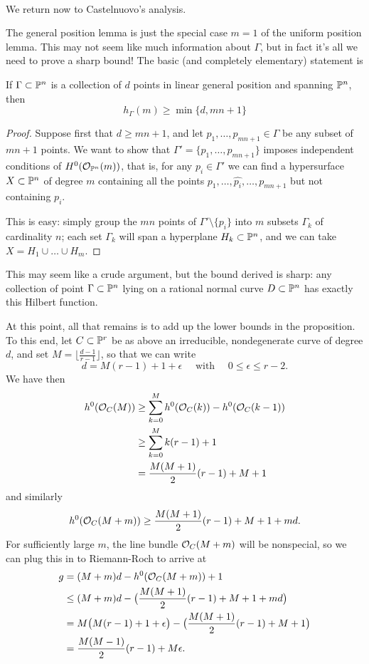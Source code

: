\

We return now to Castelnuovo's analysis.

The general position lemma is just the special case $m=1$ of the uniform position lemma. This may not seem like much information about $\Gamma$, but in fact it's all we need to prove a sharp bound! The basic (and completely elementary) statement is

\begin{proposition}
If $\Gamma \subset {\mathbb P}^n$ is a collection of $d$ points in linear general position and spanning ${\mathbb P}^n$, then 
$$
h_\Gamma(m) \geq \min\{d, mn+1\}
$$
\end{proposition}

\begin{proof}
Suppose first that $d \geq mn+1$, and let $p_1,\dots,p_{mn+1} \in \Gamma$ be any subset of $mn+1$ points. We want to show that $\Gamma' = \{p_1,\dots,p_{mn+1}\}$ imposes independent conditions of $H^0({\mathcal O}_{{\mathbb P}^n}(m))$, that is, for any $p_i \in \Gamma'$ we can find a hypersurface $X \subset {\mathbb P}^n$ of degree $m$ containing all the points $p_1,\dots, \hat{p_i},\dots,p_{mn+1}$ but not containing $p_i$.

This is easy: simply group the $mn$ points of $\Gamma' \setminus \{p_i\}$ into $m$ subsets $\Gamma_k$ of cardinality $n$; each set $\Gamma_k$ will span a hyperplane $H_k \subset {\mathbb P}^n$, and we can take $X = H_1 \cup \dots \cup H_m$. 
\end{proof}

This may seem like a crude argument, but the bound derived is sharp: any collection of point $\Gamma \subset {\mathbb P}^n$ lying on a rational normal curve $D \subset {\mathbb P}^n$ has exactly this Hilbert function.

At this point, all that remains is to add up the lower bounds in the proposition. To this end, let $C \subset {\mathbb P}^r$ be as above an irreducible, nondegenerate curve of degree $d$, and set $M = \lfloor{\frac{d-1}{r-1}}\rfloor$, so that we can write
$$
d = M(r-1) + 1 + \epsilon \quad \text{ with } \quad 0 \leq \epsilon \leq r-2.
$$
We have then
\begin{align*}
h^0({\mathcal O}_C(M)) &\geq \sum_{k=0}^M h^0({\mathcal O}_C(k)) - h^0({\mathcal O}_C(k-1)) \\
&\geq  \sum_{k=0}^M k(r-1)+1 \\
&= \frac{M(M+1)}{2}(r-1) + M + 1
\end{align*}
and similarly
$$
h^0({\mathcal O}_C(M+m)) \geq \frac{M(M+1)}{2}(r-1) + M + 1 + md.
$$
For sufficiently large $m$, the line bundle ${\mathcal O}_C(M+m)$ will be nonspecial, so we can plug this in to Riemann-Roch to arrive at
\begin{align*}
g &= (M+m)d - h^0({\mathcal O}_C(M+m)) + 1 \\
&\leq (M+m)d - \bigl(  \frac{M(M+1)}{2}(r-1) + M + 1 + md \bigr) \\
& = M\bigl( M(r-1) + 1 + \epsilon \bigr) - \bigl(  \frac{M(M+1)}{2}(r-1) + M + 1 \bigr) \\
&= \frac{M(M-1)}{2}(r-1) + M\epsilon.
\end{align*}

